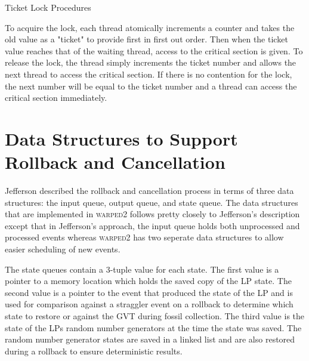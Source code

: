 \documentclass[11pt]{book}
\begin{document}
\begin{algorithm}
\DontPrintSemicolon
{}
\SetAlgoVlined

    \;


    \caption{Ticket Lock Procedures}\cite{wiki:ticketlock-15}\label{ticket_lock}
\end{algorithm}

\noindent
To acquire the lock, each thread atomically increments a counter and takes the old value as
a "ticket" to provide first in first out order. Then when the ticket value reaches that
of the waiting thread, access to the critical section is given. To release the lock, the thread
simply increments the ticket number and allows the next thread to access the critical section.
If there is no contention for the lock, the next number will be equal to the ticket number and
a thread can access the critical section immediately.

\section{Data Structures to Support Rollback and Cancellation}

Jefferson\cite{jefferson-85} described the rollback and cancellation process in terms of three
data structures: the input queue, output queue, and state queue. The data structures that are
implemented in \textsc{warped2} follows pretty closely to Jefferson's description except that
in Jefferson's approach, the input queue holds both unprocessed and processed events whereas
\textsc{warped2} has two seperate data structures to allow easier scheduling of new events.

The state queues contain a 3-tuple value for each state. The first value is a pointer to a
memory location which holds the saved copy of the LP state. The second value is a pointer to the
event that produced the state of the LP and is used for comparison against a straggler event
on a rollback to determine which state to restore or against the GVT during fossil collection.
The third value is the state of the LPs random number generators at the time the state was saved.
The random number generator states are saved in a linked list and are also restored during a
rollback to ensure deterministic results.
\end{document}
